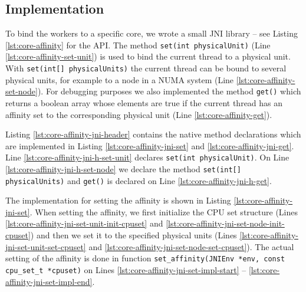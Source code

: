 \subsection{Implementation}
\label{sec:locality-implementation-core-affinity-implementation}

To bind the workers to a specific core, we wrote a small JNI library
-- see Listing \ref{lst:core-affinity} for the API. The method
\lstinline!set(int physicalUnit)!  (Line
\ref{lst:core-affinity-set-unit}) is used to bind the current thread
to a physical unit. With \lstinline!set(int[] physicalUnits)! the
current thread can be bound to several physical units, for example to
a node in a NUMA system (Line \ref{lst:core-affinity-set-node}). For
debugging purposes we also implemented the method \lstinline!get()!
which returns a boolean array whose elements are true if the current
thread has an affinity set to the corresponding physical unit (Line
\ref{lst:core-affinity-get}).



Listing \ref{lst:core-affinity-jni-header} contains the native method
declarations which are implemented in Listing
\ref{lst:core-affinity-jni-set} and
\ref{lst:core-affinity-jni-get}. Line
\ref{lst:core-affinity-jni-h-set-unit} declares
\lstinline!set(int physicalUnit)!. On Line
\ref{lst:core-affinity-jni-h-set-node} we declare the method
\lstinline!set(int[] physicalUnits)! and \lstinline!get()! is declared
on Line \ref{lst:core-affinity-jni-h-get}.





The implementation for setting the affinity is shown in Listing
\ref{lst:core-affinity-jni-set}. When setting the affinity, we first
initialize the CPU set structure (Lines
\ref{lst:core-affinity-jni-set-unit-init-cpuset} and
\ref{lst:core-affinity-jni-set-node-init-cpuset}) and then we set it
to the specified physical units (Lines
\ref{lst:core-affinity-jni-set-unit-set-cpuset} and
\ref{lst:core-affinity-jni-set-node-set-cpuset}). The actual setting of
the affinity is done in function
\lstinline!set_affinity(JNIEnv *env, const cpu_set_t *cpuset)! on Lines
\ref{lst:core-affinity-jni-set-impl-start} --
\ref{lst:core-affinity-jni-set-impl-end}.

